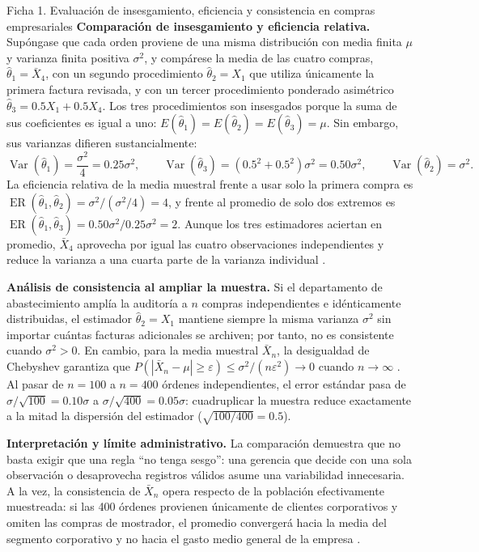 {\begin{fichainvestigacion}{Ficha 1. Evaluación de insesgamiento, eficiencia y consistencia en compras empresariales}
\textbf{Comparación de insesgamiento y eficiencia relativa.} Supóngase que cada orden proviene de una misma distribución con media finita $\mu$ y varianza finita positiva $\sigma^2$, y compárese la media de las cuatro compras, $\hat{\theta}_1 = \bar{X}_4$, con un segundo procedimiento $\hat{\theta}_2 = X_1$ que utiliza únicamente la primera factura revisada, y con un tercer procedimiento ponderado asimétrico $\hat{\theta}_3 = 0.5X_1 + 0.5X_4$. Los tres procedimientos son insesgados porque la suma de sus coeficientes es igual a uno: $E(\hat{\theta}_1)=E(\hat{\theta}_2)=E(\hat{\theta}_3)=\mu$. Sin embargo, sus varianzas difieren sustancialmente:
\[
  \operatorname{Var}(\hat{\theta}_1)=\frac{\sigma^2}{4}=0.25\sigma^2,\qquad
  \operatorname{Var}(\hat{\theta}_3)=(0.5^2+0.5^2)\sigma^2=0.50\sigma^2,\qquad
  \operatorname{Var}(\hat{\theta}_2)=\sigma^2.
\]
La eficiencia relativa de la media muestral frente a usar solo la primera compra es $\operatorname{ER}(\hat{\theta}_1, \hat{\theta}_2) = \sigma^2 / (\sigma^2/4) = 4$, y frente al promedio de solo dos extremos es $\operatorname{ER}(\hat{\theta}_1, \hat{\theta}_3) = 0.50\sigma^2 / 0.25\sigma^2 = 2$. Aunque los tres estimadores aciertan en promedio, $\bar{X}_4$ aprovecha por igual las cuatro observaciones independientes y reduce la varianza a una cuarta parte de la varianza individual \citep[secs.~8.2 y 9.2]{wackerly2010}.

\textbf{Análisis de consistencia al ampliar la muestra.} Si el departamento de abastecimiento amplía la auditoría a $n$ compras independientes e idénticamente distribuidas, el estimador $\hat{\theta}_2 = X_1$ mantiene siempre la misma varianza $\sigma^2$ sin importar cuántas facturas adicionales se archiven; por tanto, no es consistente cuando $\sigma^2 > 0$. En cambio, para la media muestral $\bar{X}_n$, la desigualdad de Chebyshev garantiza que $P(|\bar{X}_n - \mu| \ge \varepsilon) \le \sigma^2/(n\varepsilon^2) \to 0$ cuando $n \to \infty$ \citep[sec.~9.3]{wackerly2010}. Al pasar de $n=100$ a $n=400$ órdenes independientes, el error estándar pasa de $\sigma/\sqrt{100} = 0.10\sigma$ a $\sigma/\sqrt{400} = 0.05\sigma$: cuadruplicar la muestra reduce exactamente a la mitad la dispersión del estimador ($\sqrt{100/400}=0.5$).

\textbf{Interpretación y límite administrativo.} La comparación demuestra que no basta exigir que una regla ``no tenga sesgo'': una gerencia que decide con una sola observación o desaprovecha registros válidos asume una variabilidad innecesaria. A la vez, la consistencia de $\bar{X}_n$ opera respecto de la población efectivamente muestreada: si las 400 órdenes provienen únicamente de clientes corporativos y omiten las compras de mostrador, el promedio convergerá hacia la media del segmento corporativo y no hacia el gasto medio general de la empresa \citep{bradley2021}.
\end{fichainvestigacion}

}
